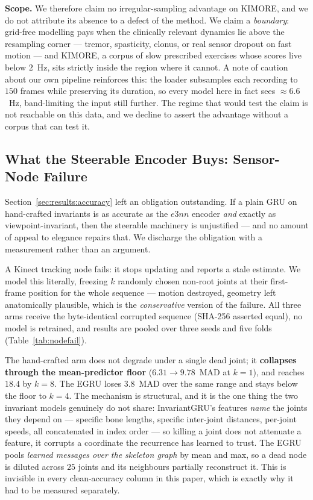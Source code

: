 \textbf{Scope.} We therefore claim no irregular-sampling advantage on KIMORE, and we do not attribute
its absence to a defect of the method. We claim a \emph{boundary}: grid-free modelling pays when the
clinically relevant dynamics lie above the resampling corner --- tremor, spasticity, clonus, or real
sensor dropout on fast motion --- and KIMORE, a corpus of slow prescribed exercises whose scores live
below $2$~Hz, sits strictly inside the region where it cannot. A note of caution about our own
pipeline reinforces this: the loader subsamples each recording to $150$ frames while preserving its
duration, so every model here in fact sees $\approx\!6.6$~Hz, band-limiting the input still further.
The regime that would test the claim is not reachable on this data, and we decline to assert the
advantage without a corpus that can test it.

\subsection{What the Steerable Encoder Buys: Sensor-Node Failure}
\label{sec:results:nodefail}

Section~\ref{sec:results:accuracy} left an obligation outstanding. If a plain GRU on hand-crafted
invariants is as accurate as the $e3nn$ encoder \emph{and} exactly as viewpoint-invariant, then the
steerable machinery is unjustified --- and no amount of appeal to elegance repairs that. We discharge
the obligation with a measurement rather than an argument.

A Kinect tracking node fails: it stops updating and reports a stale estimate. We model this
literally, freezing $k$ randomly chosen non-root joints at their first-frame position for the whole
sequence --- motion destroyed, geometry left anatomically plausible, which is the \emph{conservative}
version of the failure. All three arms receive the byte-identical corrupted sequence (SHA-256 asserted
equal), no model is retrained, and results are pooled over three seeds and five folds
(Table~\ref{tab:nodefail}).

The hand-crafted arm does not degrade under a single dead joint; it \textbf{collapses through the
mean-predictor floor} ($6.31\!\to\!9.78$~MAD at $k=1$), and reaches $18.4$ by $k=8$. The EGRU loses
$3.8$~MAD over the same range and stays below the floor to $k=4$. The mechanism is structural, and it
is the one thing the two invariant models genuinely do not share: InvariantGRU's features
\emph{name} the joints they depend on --- specific bone lengths, specific inter-joint distances,
per-joint speeds, all concatenated in index order --- so killing a joint does not attenuate a feature,
it corrupts a coordinate the recurrence has learned to trust. The EGRU pools \emph{learned messages
over the skeleton graph} by mean and max, so a dead node is diluted across $25$ joints and its
neighbours partially reconstruct it. This is invisible in every clean-accuracy column in this paper,
which is exactly why it had to be measured separately.

